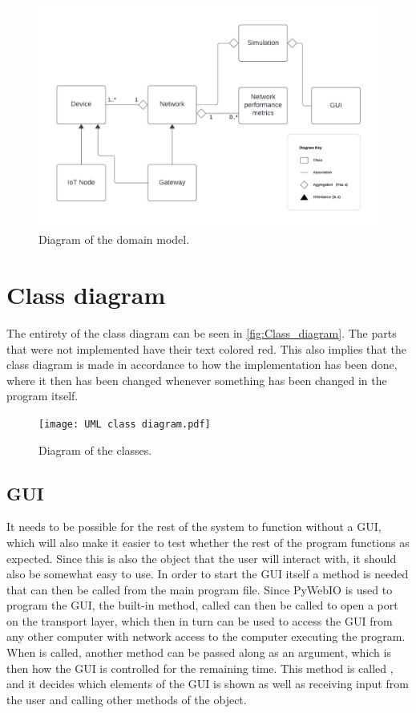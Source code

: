 \begin{figure}[H]
  \centering
  \includegraphics[width=\textwidth]{Domain_model.pdf}
  \caption{Diagram of the domain model.}
  \label{fig:Domain_model}
\end{figure}

\section{Class diagram}
The entirety of the class diagram can be seen in \autoref{fig:Class_diagram}. The parts that were not implemented have their text colored red. This also implies that the class diagram is made in accordance to how the implementation has been done, where it then has been changed whenever something has been changed in the program itself.

\begin{figure}[H]
  \centering
  \texttt{[image: UML class diagram.pdf]}
  \caption{Diagram of the classes.}
  \label{fig:Class_diagram}
\end{figure}

\subsection{GUI} It needs to be possible for the rest of the system to function without a GUI, which will also make it easier to test whether the rest of the program functions as expected. Since this is also the object that the user will interact with, it should also be somewhat easy to use. In order to start the GUI itself a  method is needed that can then be called from the main program file. Since PyWebIO is used to program the GUI, the built-in method, called  can then be called to open a port on the transport layer, which then in turn can be used to access the GUI from any other computer with network access to the computer executing the program. When  is called, another method can be passed along as an argument, which is then how the GUI is controlled for the remaining time. This method is called , and it decides which elements of the GUI is shown as well as receiving input from the user and calling other methods of the  object.

